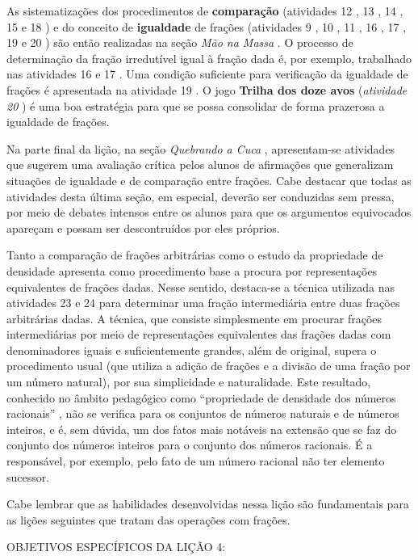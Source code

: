   As sistematizações dos procedimentos de   {\bf comparação}   (atividades 12  ,
13  , 14  , 15   e 18  ) e do conceito de   {\bf igualdade}   de frações
(atividades 9  , 10  , 11  , 16  , 17  , 19   e 20  ) são então realizadas na
seção   {\it Mão na Massa}  . O processo de determinação da fração irredutível
igual à fração dada é, por exemplo, trabalhado nas atividades 16   e 17  . Uma
condição suficiente para verificação da igualdade de frações é apresentada na
atividade 19  . O jogo   {\bf Trilha dos doze avos}   (\emph{atividade 20}  ) é
uma boa estratégia para que se possa consolidar de forma prazerosa a igualdade
de frações.

  Na parte final da lição, na seção   {\it Quebrando a Cuca}  , apresentam-se
atividades que sugerem uma avaliação crítica pelos alunos de afirmações que
generalizam situações de igualdade e de comparação entre frações. Cabe destacar
que todas as atividades desta última seção, em especial, deverão ser conduzidas
sem pressa, por meio de debates intensos entre os alunos para que os argumentos
equivocados apareçam e possam ser descontruídos por eles próprios.

  Tanto a comparação de frações arbitrárias como o estudo da propriedade de
densidade apresenta como procedimento base a procura por representações
equivalentes de frações dadas. Nesse sentido, destaca-se a técnica utilizada nas
atividades 23   e 24   para determinar uma fração intermediária entre duas
frações arbitrárias dadas. A técnica, que consiste simplesmente em procurar
frações intermediárias por meio de representações equivalentes das frações dadas
com denominadores iguais e suficientemente grandes, além de original, supera o
procedimento usual (que utiliza a adição de frações e a divisão de uma fração
por um número natural), por sua simplicidade e naturalidade. Este resultado,
conhecido no âmbito pedagógico como   ``propriedade de densidade dos números
racionais''  , não se verifica para os conjuntos de números naturais e de
números inteiros, e é, sem dúvida, um dos fatos mais notáveis na extensão que se
faz do conjunto dos números inteiros para o conjunto dos números racionais.  É a
responsável, por exemplo, pelo fato de um número racional não ter elemento
sucessor.

  Cabe lembrar que as habilidades desenvolvidas nessa lição são fundamentais
para as lições seguintes que tratam das operações com frações.
  \vspace{.15cm}

\noindent OBJETIVOS ESPECÍFICOS DA LIÇÃO 4:
\vspace{.15cm}

